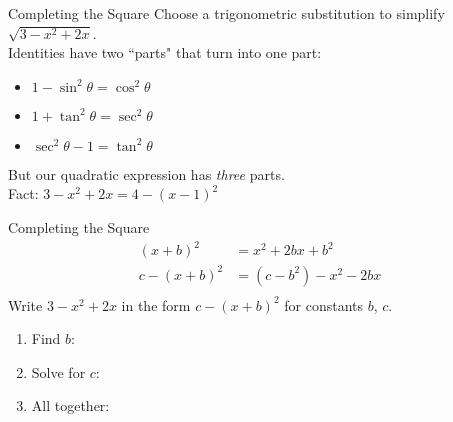 \begin{frame}[t]{Completing the Square}
\label{note1.9b}
Choose a trigonometric substitution to simplify $\sqrt{3-x^2+2x}$.\\[1em]

Identities have two ``parts" that turn into one part:
 \begin{itemize}\color{W2}
\item $1-\sin^2\theta=\cos^2\theta$ \hspace{1cm}
\item $1+\tan^2\theta=\sec^2\theta$
\item $\sec^2\theta-1=\tan^2\theta$
\end{itemize}
But our quadratic expression has \textit{three} parts.\\
\pause
Fact: \quad $3-x^2+2x=4-(x-1)^2$\hfill~

\end{frame}
\begin{frame}[t]{Completing the Square}
{\color{W1}\begin{align*}
(x+b)^2&=x^2+2bx+b^2\\
c-(x+b)^2&=(c-b^2)-x^2-2bx\\
\end{align*}}
Write $3-x^2+2x$ in the form $c-(x+b)^2$ for constants $b$, $c$.\pause\vfill
\begin{enumerate}[<+->]
	\item Find $b$:  \qquad{}\vfill
	\item Solve for $c$: \qquad{}\vfill
	\item All together: \qquad{}\vfill
\end{enumerate}

\end{frame}
